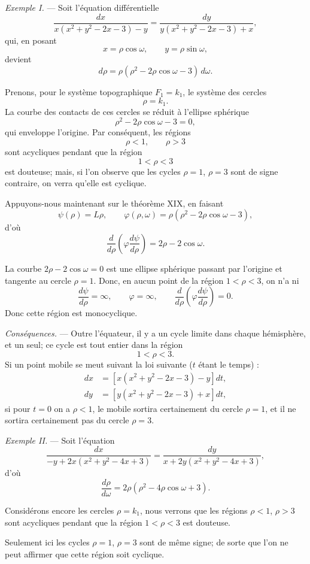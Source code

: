 \documentclass[11pt]{article}
\begin{document}
\emph{Exemple I.} --- Soit l’équation différentielle
\[
\frac{dx}{x(x^2+y^2-2x-3)-y}
=
\frac{dy}{y(x^2+y^2-2x-3)+x},
\]
qui, en posant
\[
x=\rho\cos\omega,
\qquad
 y=\rho\sin\omega,
\]
devient
\[
d\rho=\rho(\rho^2-2\rho\cos\omega-3)\,d\omega.
\]

Prenons, pour le système topographique $F_1=k_1$, le système des cercles
\[
\rho=k_1.
\]
La courbe des contacts de ces cercles se réduit à l’ellipse sphérique
\[
\rho^2-2\rho\cos\omega-3=0,
\]
qui enveloppe l’origine. Par conséquent, les régions
\[
\rho<1,
\qquad
\rho>3
\]
sont acycliques pendant que la région
\[
1<\rho<3
\]
est douteuse; mais, si l’on observe que les cycles $\rho=1$, $\rho=3$ sont de signe contraire, on verra qu’elle est cyclique.

Appuyons-nous maintenant sur le théorème XIX, en faisant
\[
\psi(\rho)=L\rho,
\qquad
\varphi(\rho,\omega)=\rho(\rho^2-2\rho\cos\omega-3),
\]
d’où
\[
\frac{d}{d\rho}\left(\varphi\frac{d\psi}{d\rho}\right)=2\rho-2\cos\omega.
\]

La courbe $2\rho-2\cos\omega=0$ est une ellipse sphérique passant par l’origine et tangente au cercle $\rho=1$. Donc, en aucun point de la région $1<\rho<3$, on n’a ni
\[
\frac{d\psi}{d\rho}=\infty,
\qquad
\varphi=\infty,
\qquad
\frac{d}{d\rho}\left(\varphi\frac{d\psi}{d\rho}\right)=0.
\]
Donc cette région est monocyclique.

\emph{Conséquences.} --- Outre l’équateur, il y a un cycle limite dans chaque hémisphère, et un seul; ce cycle est tout entier dans la région
\[
1<\rho<3.
\]
Si un point mobile se meut suivant la loi suivante ($t$ étant le temps) :
\[
\begin{aligned}
dx&=[x(x^2+y^2-2x-3)-y]dt,\\
dy&=[y(x^2+y^2-2x-3)+x]dt,
\end{aligned}
\]
si pour $t=0$ on a $\rho<1$, le mobile sortira certainement du cercle $\rho=1$, et il ne sortira certainement pas du cercle $\rho=3$.

\emph{Exemple II.} --- Soit l’équation
\[
\frac{dx}{-y+2x(x^2+y^2-4x+3)}
=
\frac{dy}{x+2y(x^2+y^2-4x+3)},
\]
d’où
\[
\frac{d\rho}{d\omega}=2\rho(\rho^2-4\rho\cos\omega+3).
\]

Considérons encore les cercles $\rho=k_1$, nous verrons que les régions $\rho<1$, $\rho>3$ sont acycliques pendant que la région $1<\rho<3$ est douteuse.

Seulement ici les cycles $\rho=1$, $\rho=3$ sont de même signe; de sorte que l’on ne peut affirmer que cette région soit cyclique.
\end{document}
